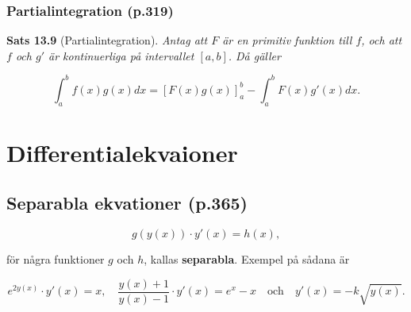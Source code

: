 \documentclass[11pt]{article}
\begin{document}
\subsubsection{Partialintegration (p.319)}

\textbf{Sats 13.9} (Partialintegration). \textit{Antag att $F$ är en primitiv funktion till $f$, och att $f$ och $g'$ är kontinuerliga på intervallet $[a, b]$. Då gäller}

\begin{equation}
    \int_a^b{f(x)g(x)}dx = \left [F(x)g(x)\right ]_a^b - \int_a^b{F(x)g'(x)}dx.
\end{equation}

\section{Differentialekvaioner}

\subsection{Separabla ekvationer (p.365)}

\begin{equation}
    g(y(x)) \cdot y'(x) = h(x),
\end{equation}

för några funktioner $g$ och $h$, kallas \textbf{separabla}. Exempel på sådana är

\begin{equation}
    e^{2y(x)} \cdot y'(x) = x, \quad \frac{y(x) + 1}{y(x) - 1} \cdot y'(x) = e^x - x \quad \text{och} \quad y'(x) = -k\sqrt{y(x)}.
\end{equation}
\end{document}
